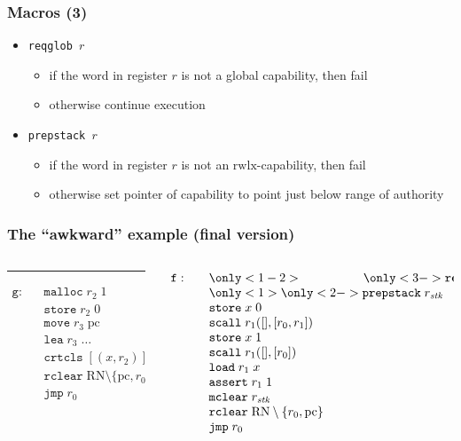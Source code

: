 \documentclass{beamer}
\newcommand{\var}[1]{\mathit{#1}}
\newcommand{\pcreg}{\mathrm{pc}}
\newcommand{\stk}{\var{stk}}
\newcommand{\plaindom}[1]{\mathrm{#1}}
\newcommand{\zinstr}[1]{\mathtt{#1}}
\newcommand{\oneinstr}[2]{\zinstr{#1} \; #2}
\newcommand{\jmp}[1]{\oneinstr{jmp}{#1}}
\newcommand{\twoinstr}[3]{\zinstr{#1} \; #2 \; #3}
\newcommand{\move}[2]{\twoinstr{move}{#1}{#2}}
\newcommand{\store}[2]{\twoinstr{store}{#1}{#2}}
\newcommand{\load}[2]{\twoinstr{load}{#1}{#2}}
\newcommand{\lea}[2]{\twoinstr{lea}{#1}{#2}}
\newcommand{\plainperm}[1]{\mathrm{#1}}
\newcommand{\rwlx}{\plainperm{rwlx}}
\begin{document}
\begin{frame}
  \frametitle{Macros (3)}
  \begin{itemize}[<+->]
  \item \texttt{reqglob $r$}
    \begin{itemize}
    \item if the word in register $r$ is not a global capability, then fail
    \item otherwise continue execution
    \end{itemize}
  \item \texttt{prepstack $r$}
    \begin{itemize}
    \item if the word in register $r$ is not an $\rwlx$-capability, then fail
    \item otherwise set pointer of capability to point just below range of authority
    \end{itemize}
  \end{itemize}
\end{frame}

\begin{frame}
 \frametitle{The ``awkward'' example (final version)}
 \begin{columns}
 \begin{column}{0.45\textwidth}
   \scalebox{.75}{\usebox{\awkwardex}}
   \rule{\textwidth}{0.4pt}
\[
  \begin{array}{lcl}
\mathtt{g}:
  &  &\mathtt{malloc} \; r_2 \; 1\\
  &  &\store{r_2}{0}\\
  &  &\move{r_3}{\pcreg}\\
  &  &\lea{r_3}{\dots}\\
  &  &\mathtt{crtcls} \;[(x, r_2)] \; r_3\\
  &  &\mathtt{rclear} \; \plaindom{RN} \setminus \{\pcreg,r_0,r_1 \}\\
  &  &\jmp{r_0}
  \end{array}
\]
 \end{column}
 \begin{column}{0.45\textwidth}
\[
\begin{array}{lcl}
\mathtt{f:}
  &  &\only<1-2>{\phantom{ \mathtt{reqglob} \; r1 }}
      \only<3->{\mathtt{reqglob} \; r1}\\
  &  &\only<1>{\phantom{ }}
      \only<2->{\mathtt{prepstack} \; r_\stk}\\
  &  &\store{x}{0}\\
  &  &\mathtt{scall} \; r_1([],[r_0,r_1])\\
  &  &\store{x}{1}\\
  &  &\mathtt{scall} \; r_1([],[r_0])\\
  &  &\load{r_1}{x}\\
  &  &\mathtt{assert} \; r_1 \; 1\\
  &  &\mathtt{mclear} \; r_\stk\\
  &  &\mathtt{rclear} \; \plaindom{RN} \setminus \{r_0,\pcreg \}\\
  &  &\jmp{r_0}
  \end{array}
\]
 \end{column}
\end{columns}

\end{frame}
\end{document}
